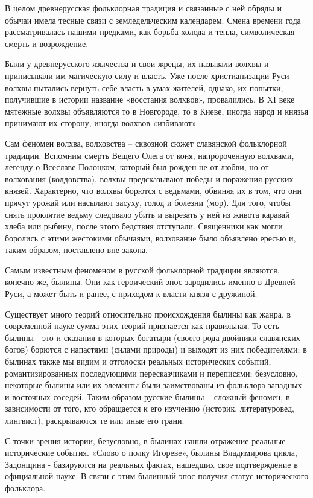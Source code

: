 \documentclass[a4paper, 12pt]{report}
\begin{document}
В целом древнерусская фольклорная традиция и связанные с ней обряды и обычаи имела тесные связи с земледельческим календарем. Смена времени года рассматривалась нашими предками, как борьба холода и тепла, символическая смерть и возрождение.

Были у древнерусского язычества и свои жрецы, их называли волхвы и приписывали им магическую силу и власть. Уже после христианизации Руси волхвы пытались вернуть себе власть в умах жителей, однако, их попытки, получившие в истории название «восстания волхвов», провалились. В XI веке мятежные волхвы объявляются то в Новгороде, то в Киеве, иногда народ и князья принимают их сторону, иногда волхвов «избивают».

Сам феномен волхва, волховства – сквозной сюжет славянской фольклорной традиции. Вспомним смерть Вещего Олега от коня, напророченную волхвами, легенду о Всеславе Полоцком, который был рожден не от любви, но от волхования (колдовства), волхвы предсказывают победы и поражения русских князей. Характерно, что волхвы борются с ведьмами, обвиняя их в том, что они прячут урожай или насылают засуху, голод и болезни (мор). Для того, чтобы снять проклятие ведьму следовало убить и вырезать у ней из живота каравай хлеба или рыбину, после этого бедствия отступали. Священники как могли боролись с этими жестокими обычаями, волхование было объявлено ересью и, таким образом, поставлено вне закона.

Самым известным феноменом в русской фольклорной традиции являются, конечно же, былины. Они как героический эпос зародились именно в Древней Руси, а может быть и ранее, с приходом к власти князя с дружиной.

Существует много теорий относительно происхождения былины как жанра, в современной науке сумма этих теорий признается как правильная. То есть былины - это и сказания  в которых богатыри (своего рода двойники славянских богов) борются с напастями (силами природы) и выходят из них победителями; в былинах также мы видим и отголоски реальных исторических событий, романтизированных последующими пересказчиками и переписями; безусловно, некоторые былины или их элементы были заимствованы из фольклора западных и восточных соседей. Таким образом русские былины – сложный феномен, в зависимости от того, кто обращается к его изучению (историк, литературовед, лингвист), раскрываются те или иные его грани. 

С точки зрения истории, безусловно, в былинах нашли отражение реальные исторические события. «Слово о полку Игореве», былины Владимирова цикла, Задонщина - базируются на реальных фактах, нашедших свое подтверждение в официальной науке. В связи с этим былинный эпос получил статус исторического фольклора.
\end{document}
